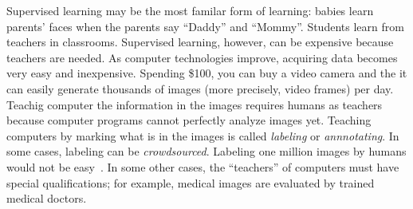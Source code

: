 Supervised learning may be the most familar form of learning: babies
learn parents' faces when the parents say ``Daddy'' and ``Mommy''.
Students learn from teachers in classrooms.  Supervised learning,
however, can be expensive because teachers are needed.  As computer
technologies improve, acquiring data becomes very easy and
inexpensive.  Spending \$100, you can buy a video camera and the it
can easily generate thousands of images (more precisely, video frames)
per day. Teachig computer the information in the images requires
humans as teachers because computer programs cannot perfectly analyze
images yet.  Teaching computers by marking what is in the images is
called {\it labeling} or {\it annnotating}.  In some cases, labeling
can be {\it crowdsourced}.  Labeling one million images by humans
would not be easy~\cite{Russakovsky2015ImageNetLargeScale211252}.
 In some other cases, the ``teachers'' of
computers must have special qualifications; for example, medical
images are evaluated by trained medical doctors.

 


\begin{comment}
\vspace{0.1in}
\begin{table}
  \caption{Four types of learning}
  \begin{tabular}{p{1in}p{1in}p{1in}p{1in}p{1in}}
    &    {\bf Supervised} & {\bf Unsupervised} & {\bf Reinforcement} & {\bf Transfer}\\
    \hline
    Teacher & Yes & No & No \\
    Correct Answer & Yes & No & No \\
    Consider Sequences & No & No & Yes \\
    Applications & Answer Yes/No & Cluster data & Develop strategies \\
  \end{tabular}

  \label{table:threetypesoflearning}
\end{table}
\vspace{0.1in}

\end{comment}

\begin{comment}
http://incompleteideas.net/book/bookdraft2017nov5.pdf
Reinforcement Learning: An Introduction
Richard S. Sutton and Andrew G. Barto
\end{comment}



